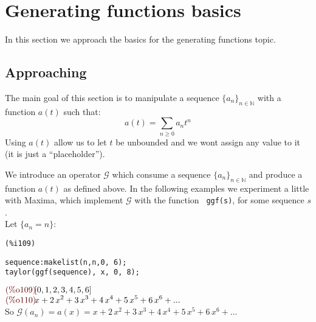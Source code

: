 \section{Generating functions basics}

In this section we approach the basics for the generating functions
topic.

\subsection{Approaching}

The main goal of this section is to manipulate a sequence $\{a_n\}_{n\in
  \mathbb{N} }$ with a function $a(t)$ such that:
\begin{displaymath}
  a(t) = \sum_{n \geq 0}{a_n t^n} 
\end{displaymath}
Using $a(t)$ allow us to let $t$ be unbounded and we wont assign any
value to it (it is just a ``placeholder'').

We introduce an operator $\mathcal{G}$ which consume a sequence
$\{a_n\}_{n\in \mathbb{N} }$ and produce a function $a(t)$ as defined
above. In the following examples we experiment a little with Maxima,
which implement $\mathcal{G}$ with the function 
\texttt{\color{blue} ggf(s)}, for some sequence $s$.\\

Let $\{a_n = n\}$:\\
\noindent
\begin{minipage}[t]{8ex}{\color{red}\bf
\begin{verbatim}
(%i109) 
\end{verbatim}}
\end{minipage}
\begin{minipage}[t]{\textwidth}{\color{blue}
\begin{verbatim}
sequence:makelist(n,n,0, 6);
taylor(ggf(sequence), x, 0, 8);
\end{verbatim}}
\end{minipage}
\begin{math}\displaystyle
\parbox{8ex}{\color{labelcolor}(\%o109) }
[0,1,2,3,4,5,6]
\end{math}\\
\begin{math}\displaystyle
\parbox{8ex}{\color{labelcolor}(\%o110) }
x+2\,{x}^{2}+3\,{x}^{3}+4\,{x}^{4}+5\,{x}^{5}+6\,{x}^{6}+...
\end{math}\\
So $\mathcal{G}(a_n) = a(x)=
x+2\,{x}^{2}+3\,{x}^{3}+4\,{x}^{4}+5\,{x}^{5}+6\,{x}^{6}+...$\\

